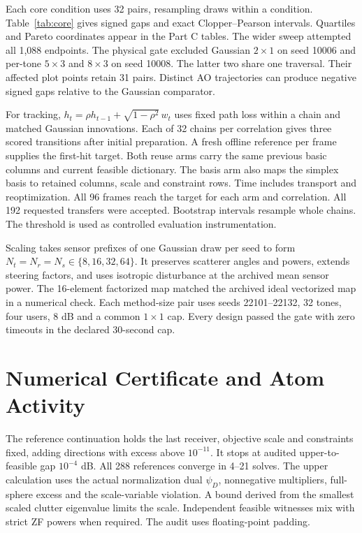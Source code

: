 \documentclass[journal]{IEEEtran}
\begin{document}
Each core condition uses 32 pairs, resampling draws within a condition. Table~\ref{tab:core} gives signed gaps and exact Clopper--Pearson intervals. Quartiles and Pareto coordinates appear in the Part C tables. The wider sweep attempted all 1,088 endpoints. The physical gate excluded Gaussian \(2\times1\) on seed 10006 and per-tone \(5\times3\) and \(8\times3\) on seed 10008. The latter two share one traversal. Their affected plot points retain 31 pairs. Distinct AO trajectories can produce negative signed gaps relative to the Gaussian comparator.

For tracking, \(h_t=\rho h_{t-1}+\sqrt{1-\rho^2}\,w_t\) uses fixed path loss within a chain and matched Gaussian innovations. Each of 32 chains per correlation gives three scored transitions after initial preparation. A fresh offline reference per frame supplies the first-hit target. Both reuse arms carry the same previous basic columns and current feasible dictionary. The basis arm also maps the simplex basis to retained columns, scale and constraint rows. Time includes transport and reoptimization. All 96 frames reach the target for each arm and correlation. All 192 requested transfers were accepted. Bootstrap intervals resample whole chains. The threshold is used as controlled evaluation instrumentation.

Scaling takes sensor prefixes of one Gaussian draw per seed to form \(N_t=N_r=N_s\in\{8,16,32,64\}\). It preserves scatterer angles and powers, extends steering factors, and uses isotropic disturbance at the archived mean sensor power. The 16-element factorized map matched the archived ideal vectorized map in a numerical check. Each method-size pair uses seeds 22101--22132, 32 tones, four users, 8 dB and a common \(1\times1\) cap. Every design passed the gate with zero timeouts in the declared 30-second cap.

\section{Numerical Certificate and Atom Activity}
The reference continuation holds the last receiver, objective scale and constraints fixed, adding directions with excess above \(10^{-11}\). It stops at audited upper-to-feasible gap \(10^{-4}\) dB. All 288 references converge in 4--21 solves. The upper calculation uses the actual normalization dual \(\psi_D\), nonnegative multipliers, full-sphere excess and the scale-variable violation. A bound derived from the smallest scaled clutter eigenvalue limits the scale. Independent feasible witnesses mix with strict ZF powers when required. The audit uses floating-point padding.
\end{document}
